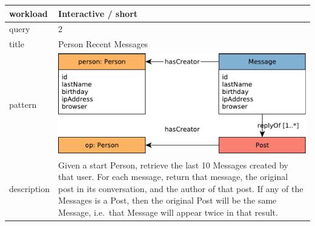 \renewcommand*{\arraystretch}{1.1}

\noindent\begin{tabularx}{17cm}{|p{1.95cm}|X|}
	\hline
	workload    & Interactive / short \\ \hline
%
	query       & 2 \\ \hline
%
	title       & Person Recent Messages \\ \hline
%
    pattern     & \hfill\includegraphics[scale=\patternscale,margin=0cm .2cm]{patterns/interactive-short-read-02}\hfill\vadjust{} \\ \hline
%
	description & Given a start Person, retrieve the last 10 Messages created by that
user. For each message, return that message, the original post in its
conversation, and the author of that post. If any of the Messages is a
Post, then the original Post will be the same Message, i.e.~that Message
will appear twice in that result.
 \\ \hline
	

\end{tabularx}
